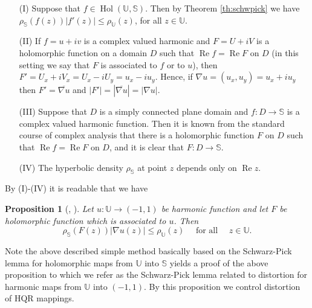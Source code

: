 \documentclass{amsart}
\newcommand{\re}{\mathop{\mathrm{Re}}}
\newcommand{\Hol}{\mathop{\mathrm{Hol}}}
\newtheorem{proposition}{Proposition}
\begin{document}
\begin{itemize}
\item[(I)] Suppose  that $f\in\Hol(\mathbb{U},\mathbb{S})$. Then by Theorem \ref{th:schwpick} we have $\rho_{\mathbb{S}}(f(z))|f'(z)|\leqslant\rho_{\mathbb{U}}(z)$, for all $z\in \mathbb{U}$.
\item[(II)] If $f=u+iv$ is  a  complex valued  harmonic and $F=U+iV$ is a holomorphic function on a domain  $D$   such that $\re{f}=\re{F}$  on  $D$ (in this setting we say that $F$ is associated to $f$ or to $u$), then $F'=U_x+iV_x = U_x-iU_y = u_x-iu_y$. Hence, if $\nabla u=(u_x,u_y)=u_x+iu_y$ then $F'=\overline{\nabla u}$ and $|F'|=|\overline{\nabla u}|=|\nabla u|$.
\item[(III)] Suppose that $D$ is a simply connected plane domain and $f:D \rightarrow \mathbb{S}$ is a complex valued harmonic function. Then it is known from the standard course of complex analysis that there is a holomorphic function $F$ on $D$  such that  $\re{f} = \re{F}$ on $D$, and it is clear that $F:D\rightarrow\mathbb{S}$.
\item[(IV)] The hyperbolic density $\rho_{\mathbb{S}}$ at point $z$  depends only on  $\re{z}$.
\end{itemize}
By  (I)-(IV)  it is readable  that   we have
\begin{proposition}[{\cite[Proposition 2.4]{MMSchw_Kob}}, \cite{kavu,hhChen}]\label{prop:mm}
Let $u:\mathbb{U}\rightarrow(-1,1)$ be harmonic function and let $F$ be holomorphic function which  is associated to $u$. Then
\begin{equation}\label{lemhqr:fla3}
    \rho_{\mathbb{S}}(F(z))|\nabla u(z)|\leqslant \rho_{\mathbb{U}}(z)\quad \mbox{ for all }\quad z\in\mathbb{U}.
\end{equation}
\end{proposition}
Note  the above described  simple  method
basically    based  on  the Schwarz-Pick lemma for holomorphic maps from $\mathbb{U}$ into $\mathbb{S}$ yields a proof of  the above proposition to which we  refer  as the Schwarz-Pick lemma related to distortion for harmonic maps from $\mathbb{U}$ into $(-1,1)$. By this proposition  we control  distortion  of HQR mappings.
\end{document}
